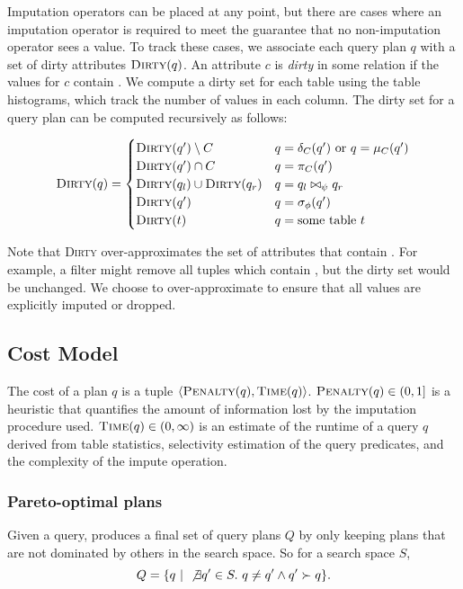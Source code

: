 Imputation operators can be placed at any point, but there are cases where an imputation operator is required to meet the guarantee that no non-imputation operator sees a \nullv{} value. To track these cases, we associate each query plan $q$ with a set of dirty attributes $\textsc{Dirty}(q)$. An attribute $c$ is \emph{dirty} in some relation if the values for $c$ contain \nullv{}. We compute a dirty set for each table using the table histograms, which track the number of \nullv{} values in each column. The dirty set for a query plan can be computed recursively as follows:

\begin{align*}
  \textsc{Dirty}(q) = \begin{cases}
    \textsc{Dirty}(q') \setminus C & q = \delta_C(q')\ \text{or}\ q = \mu_C(q') \\
    \textsc{Dirty}(q') \cap C & q = \pi_C(q') \\
    \textsc{Dirty}(q_l) \cup \textsc{Dirty}(q_r) & q = q_l \bowtie_\psi q_r \\
    \textsc{Dirty}(q') & q = \sigma_\phi(q') \\
    \textsc{Dirty}(t) & q = \text{some table}\ t \\
  \end{cases}
\end{align*}

Note that \textsc{Dirty} over-approximates the set of attributes that contain \nullv{}. For example, a filter might remove all tuples which contain \nullv{}, but the dirty set would be unchanged. We choose to over-approximate to ensure that all \nullv{} values are explicitly imputed or dropped.


\subsection{Cost Model}
\label{sec:cost-model}
The cost of a plan $q$ is a tuple $\langle \textsc{Penalty}(q), \textsc{Time}(q) \rangle$.
$\textsc{Penalty}(q) \in (0,1]$ is a heuristic that quantifies the amount of information lost by the imputation procedure used.
$\textsc{Time}(q) \in (0, \infty)$ is an estimate of the runtime of a query $q$ derived from table statistics, selectivity estimation of the query predicates, and the complexity of the
impute operation. 

\subsubsection{Pareto-optimal plans}\label{subsubsec:pareto}
Given a query, \ProjectName{} produces a final set of query plans $Q$ by only keeping plans that are not dominated by others in the search space. So for a search space $S$, \[Q= \{ q ~|~ \not\exists q' \in S.\ q \neq q' \land q' \succ q \}.\]

